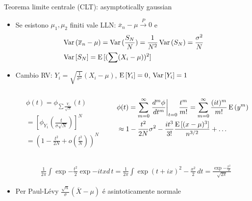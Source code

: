 \documentclass[asd-beamer.tex]{subfiles}%
\begin{document}
\begin{frame}{Teorema limite centrale (CLT): asymptotically gaussian}
\begin{itemize}
\item Se esistono $\mu_1, \mu_2$ finiti vale LLN: $\overline{x}_n-\mu\xrightarrow{P}0$ e
\begin{align*}
&\operatorname{Var}{(\overline{x}_n-\mu)}=\operatorname{Var}{(\frac{S_N}{N})}=\frac{1}{N^2}\operatorname{Var}{(S_N)}=\frac{\sigma^2}{N}\\
&\operatorname{Var}{[S_N]}=\operatorname{E}{[(\sum(X_i-\mu))^2]}
\end{align*}
\item Cambio RV: $Y_i=\sqrt{\frac{1}{\sigma^2}}(X_i-\mu)$, $\operatorname{E}{[Y_i]}=0$, $\operatorname{Var}{[Y_i]}=1$
\begin{columns}[T]
\begin{column}{0.4\textwidth}
\begin{align*}
&\phi(t)=\phi_{\sum\frac{Y_i}{\sqrt{N}}}(t)\\
&=[\phi_{Y_1}(\frac{t}{\sigma\sqrt{N}})]^N\\
&=(1-\frac{t^2}{2N}+o(\frac{t^2}{N}))^N
\end{align*}
	\end{column}
	\begin{column}{0.7\textwidth}
\begin{align*}
&\phi(t)=\sum_{m=0}^{\infty}\left.\frac{d^m\phi}{dt^m}\right|_{t=0}\frac{t^m}{m!}=\sum_{m=0}^{\infty}\frac{(it)^m}{m!}\operatorname{E}{(y^m)}\\
&\approx1-\frac{t^2}{2N}\sigma^2-\frac{it^3}{3!}\frac{\operatorname{E}{[(x-\mu)^3]}}{n^{3/2}}+\ldots
\end{align*}
	\end{column}
\end{columns}
\begin{align*}
&\frac{1}{2\pi}\int\exp{-\frac{t^2}{2}}\exp{-itx}d\,t=\frac{1}{2\pi}\int\exp{(t+ix)^2-\frac{x^2}{2}}\,dt=\frac{\exp{-\frac{x^2}{2}}}{\sqrt{2\pi}}
\end{align*}
\item Per Paul-L\'evy $\frac{\sqrt{n}}{\sigma}(\overline{X}-\mu)$ \'e asintoticamente normale
\end{itemize}
\end{frame}
\end{document}
